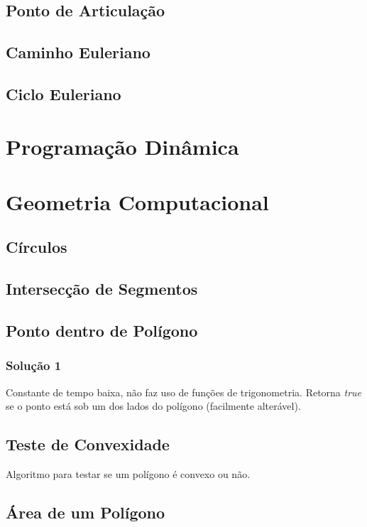 \documentclass[12pt,a4paper]{article}
\begin{document}
		\subsection{Ponto de Articulação}
			
		\subsection{Caminho Euleriano}
		\subsection{Ciclo Euleriano}

	\section{Programação Dinâmica}
	
	\section{Geometria Computacional}
		
		\subsection{Círculos}
			
		\subsection{Intersecção de Segmentos}
			
		\subsection{Ponto dentro de Polígono}
			\subsubsection{Solução 1}
				Constante de tempo baixa, não faz uso de funções de trigonometria. Retorna \emph{true} se o ponto está sob um dos lados do polígono (facilmente alterável).
				
		\subsection{Teste de Convexidade}
			Algoritmo para testar se um polígono é convexo ou não.
		\subsection{Área de um Polígono}
\end{document}
